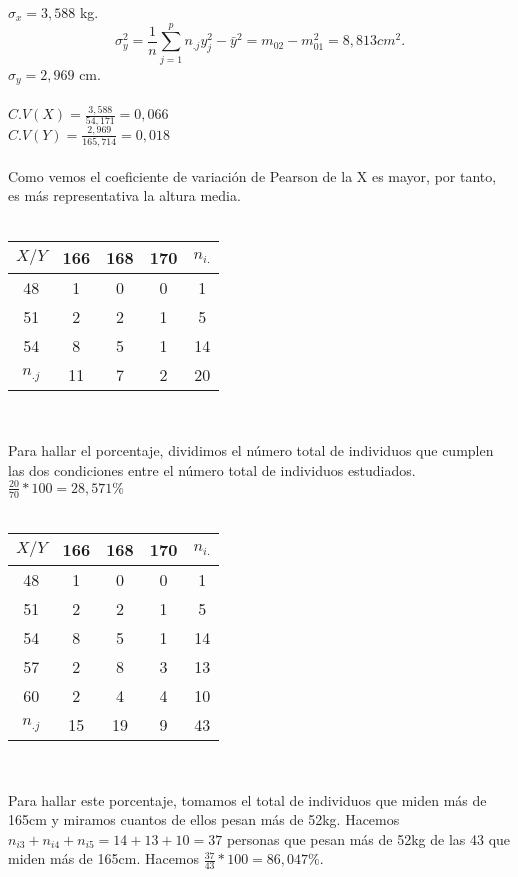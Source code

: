     $\sigma_x = 3,588$ kg. \\
    \[ \sigma_y^2 = \frac{1}{n}\sum_{j=1}^{p}n_{.j}y_j^2-\bar{y}^2 = m_{02}-m_{01}^2 = 8,813cm^2.\]
    $\sigma_y = 2,969$ cm. \\ \\
    $C.V(X) = \frac{3,588}{54,171} = 0,066$ \\
    $C.V(Y) = \frac{2,969}{165,714} = 0,018$ \\  \\
    Como vemos el coeficiente de variación de Pearson de la X es mayor, por tanto, es más representativa la altura media. \\ \\
    
\subproblem
    \begin{center}
    \begin{tabular}{| c | c | c | c | c |}
        \hline
        $X / Y$ & 166 & 168 & 170 & $n_{i.}$ \\ \hline
        48 & 1 & 0 & 0 & 1 \\ \hline
        51 & 2 & 2 & 1 & 5 \\ \hline
        54 & 8 & 5 & 1 & 14 \\ \hline
        $n_{.j}$ & 11 & 7 & 2 & 20 \\
        \hline
    \end{tabular} \\ 
    \end{center}
    Para hallar el porcentaje, dividimos el número total de individuos que cumplen las dos condiciones entre el número total de individuos estudiados. \\
    $\frac{20}{70}*100 = 28,571\%$ \\ \\
    
\subproblem
    \begin{center}
    \begin{tabular}{| c | c | c | c | c |}
        \hline
        $X / Y$ & 166 & 168 & 170 & $n_{i.}$ \\ \hline
        48 & 1 & 0 & 0 & 1 \\ \hline
        51 & 2 & 2 & 1 & 5 \\ \hline
        54 & 8 & 5 & 1 & 14 \\ \hline
        57 & 2 & 8 & 3 & 13 \\ \hline
        60 & 2 & 4 & 4 & 10 \\ \hline
        $n_{.j}$ & 15 & 19 & 9 & 43 \\
        \hline
    \end{tabular} \\
    \end{center}
    Para hallar este porcentaje, tomamos el total de individuos que miden más de 165cm y miramos cuantos de ellos pesan más de 52kg. Hacemos $n_{i3}+n_{i4}+n_{i5} = 14+13+10 = 37$ personas que pesan más de 52kg de las 43 que miden más de 165cm. Hacemos $\frac{37}{43}*100 = 86,047\%$. \\ \\
    
